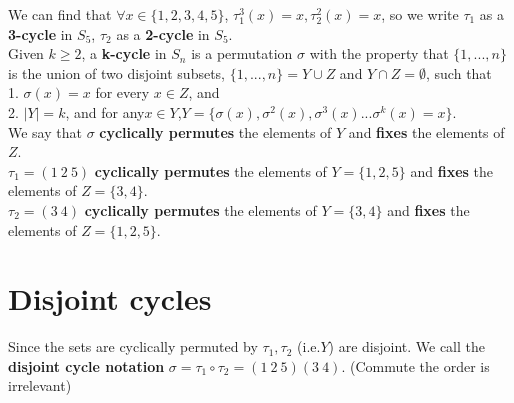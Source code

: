 \documentclass[11pt]{elegantbook}
\begin{document}
We can find that $\forall x\in \{1,2,3,4,5\}$, $\tau_1^{3}(x)=x, \tau_2^{2}(x)=x$, so we write $\tau_1$ as a \textbf{3-cycle} in $S_5$, $\tau_2$ as a \textbf{2-cycle} in $S_5$.\\

Given $k \geq 2$, a \textbf{k-cycle} in $S_n$ is a permutation $\sigma$ with the property that $\{1,...,n\}$ is the union of two disjoint subsets, $\{1,...,n\}=Y \cup Z $ and $Y \cap Z =\emptyset$, such that\\
1. $\sigma(x) = x$ for every $x \in Z$, and\\
2. $|Y| = k$, and for any$ x \in Y$,$Y = \{\sigma (x), \sigma^2(x), \sigma^3(x)... \sigma^k(x) = x\}$.\\

We say that $\sigma$ \textbf{cyclically permutes} the elements of $Y$ and \textbf{fixes} the elements of $Z$.\\
$\tau_1=(1\ 2\ 5)$ \textbf{cyclically permutes} the elements of $Y=\{1,2,5\}$ and \textbf{fixes} the elements of $Z=\{3,4\}$.\\
$\tau_2=(3\ 4)$ \textbf{cyclically permutes} the elements of $Y=\{3,4\}$ and \textbf{fixes} the elements of $Z=\{1,2,5\}$.\\


\section{Disjoint cycles}
Since the sets are cyclically permuted by $\tau_1, \tau_2$ (i.e.$Y$) are disjoint. We call the \textbf{disjoint cycle notation} $\sigma=\tau_1\circ\tau_2=(1\ 2\ 5)(3\ 4)$. (Commute the order is irrelevant)
\end{document}
